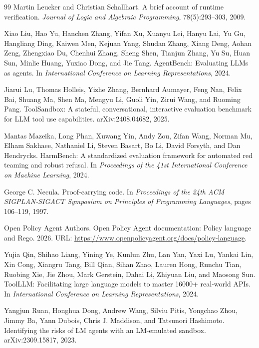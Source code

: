 \documentclass{article}
\begin{document}
\begin{thebibliography}{99}
Martin Leucker and Christian Schallhart. A brief account of runtime verification. \emph{Journal of Logic and Algebraic Programming}, 78(5):293--303, 2009.

Xiao Liu, Hao Yu, Hanchen Zhang, Yifan Xu, Xuanyu Lei, Hanyu Lai, Yu Gu, Hangliang Ding, Kaiwen Men, Kejuan Yang, Shudan Zhang, Xiang Deng, Aohan Zeng, Zhengxiao Du, Chenhui Zhang, Sheng Shen, Tianjun Zhang, Yu Su, Huan Sun, Minlie Huang, Yuxiao Dong, and Jie Tang. AgentBench: Evaluating LLMs as agents. In \emph{International Conference on Learning Representations}, 2024.

Jiarui Lu, Thomas Holleis, Yizhe Zhang, Bernhard Aumayer, Feng Nan, Felix Bai, Shuang Ma, Shen Ma, Mengyu Li, Guoli Yin, Zirui Wang, and Ruoming Pang. ToolSandbox: A stateful, conversational, interactive evaluation benchmark for LLM tool use capabilities. arXiv:2408.04682, 2025.

Mantas Mazeika, Long Phan, Xuwang Yin, Andy Zou, Zifan Wang, Norman Mu, Elham Sakhaee, Nathaniel Li, Steven Basart, Bo Li, David Forsyth, and Dan Hendrycks. HarmBench: A standardized evaluation framework for automated red teaming and robust refusal. In \emph{Proceedings of the 41st International Conference on Machine Learning}, 2024.

George C. Necula. Proof-carrying code. In \emph{Proceedings of the 24th ACM SIGPLAN-SIGACT Symposium on Principles of Programming Languages}, pages 106--119, 1997.

Open Policy Agent Authors. Open Policy Agent documentation: Policy language and Rego. 2026. URL: \url{https://www.openpolicyagent.org/docs/policy-language}.

Yujia Qin, Shihao Liang, Yining Ye, Kunlun Zhu, Lan Yan, Yaxi Lu, Yankai Lin, Xin Cong, Xiangru Tang, Bill Qian, Sihan Zhao, Lauren Hong, Runchu Tian, Ruobing Xie, Jie Zhou, Mark Gerstein, Dahai Li, Zhiyuan Liu, and Maosong Sun. ToolLLM: Facilitating large language models to master 16000+ real-world APIs. In \emph{International Conference on Learning Representations}, 2024.

Yangjun Ruan, Honghua Dong, Andrew Wang, Silviu Pitis, Yongchao Zhou, Jimmy Ba, Yann Dubois, Chris J. Maddison, and Tatsunori Hashimoto. Identifying the risks of LM agents with an LM-emulated sandbox. arXiv:2309.15817, 2023.


\end{thebibliography}
\end{document}
